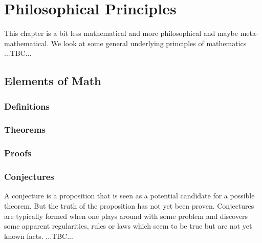 \chapter{Philosophical Principles}
This chapter is a bit less mathematical and more philosophical and maybe meta-mathematical. We look at some general underlying principles of mathematics ...TBC...



\section{Elements of Math}

\subsection{Definitions}


\subsection{Theorems}

\subsection{Proofs}


\subsection{Conjectures}
A conjecture is a proposition that is seen as a potential candidate for a possible theorem. But the truth of the proposition has not yet been proven. Conjectures are typically formed when one plays around with some problem and discovers some apparent regularities, rules or laws which seem to be true but are not yet known facts.  ...TBC...

